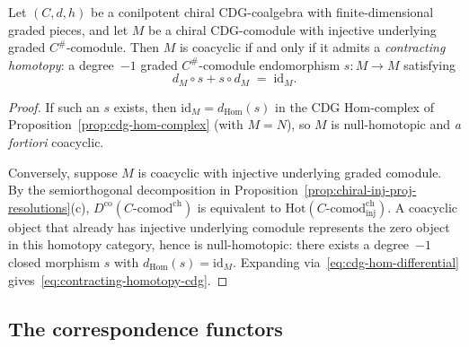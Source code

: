 \begin{corollary}
\label{cor:coacyclic-injective-contractible}
Let $(C, d, h)$ be a conilpotent chiral CDG-coalgebra with
finite-dimensional graded pieces, and let $M$ be a chiral
CDG-comodule with injective underlying graded $C^{\#}$-comodule.
Then $M$ is coacyclic if and only if it admits a
\emph{contracting homotopy}: a degree~$-1$ graded
$C^{\#}$-comodule endomorphism $s \colon M \to M$ satisfying
\begin{equation}\label{eq:contracting-homotopy-cdg}
d_M \circ s + s \circ d_M \;=\; \mathrm{id}_M.
\end{equation}
\end{corollary}

\begin{proof}
If such an $s$ exists, then $\mathrm{id}_M = d_{\mathrm{Hom}}(s)$
in the CDG Hom-complex of
Proposition~\ref{prop:cdg-hom-complex} (with $M = N$), so $M$ is
null-homotopic and \emph{a fortiori} coacyclic.

Conversely, suppose $M$ is coacyclic with injective underlying
graded comodule. By the semiorthogonal decomposition in
Proposition~\ref{prop:chiral-inj-proj-resolutions}(c),
$D^{\mathrm{co}}(C\text{-}\mathrm{comod}^{\mathrm{ch}})$
is equivalent to
$\mathrm{Hot}(C\text{-}\mathrm{comod}^{\mathrm{ch}}_{\mathrm{inj}})$.
A coacyclic object that already has injective underlying comodule
represents the zero object in this homotopy category, hence is
null-homotopic: there exists a degree~$-1$ closed morphism
$s$ with $d_{\mathrm{Hom}}(s) = \mathrm{id}_M$.
Expanding via~\eqref{eq:cdg-hom-differential} gives~\eqref{eq:contracting-homotopy-cdg}.
\end{proof}

\subsection{The correspondence functors}
\label{subsec:chiral-correspondence-functors}

